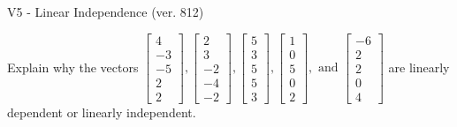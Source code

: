\begin{exercise}
  \begin{exerciseTitle}V5 - Linear Independence (ver. 812)\end{exerciseTitle}
  \begin{exerciseStatement}
    Explain why the vectors \(\left[\begin{array}{r}
4 \\
-3 \\
-5 \\
2 \\
2
\end{array}\right] , \left[\begin{array}{r}
2 \\
3 \\
-2 \\
-4 \\
-2
\end{array}\right] , \left[\begin{array}{r}
5 \\
3 \\
5 \\
5 \\
3
\end{array}\right] , \left[\begin{array}{r}
1 \\
0 \\
5 \\
0 \\
2
\end{array}\right] , \text{ and } \left[\begin{array}{r}
-6 \\
2 \\
2 \\
0 \\
4
\end{array}\right]\) are linearly dependent or linearly independent.	



\end{exerciseStatement}
\end{exercise}
